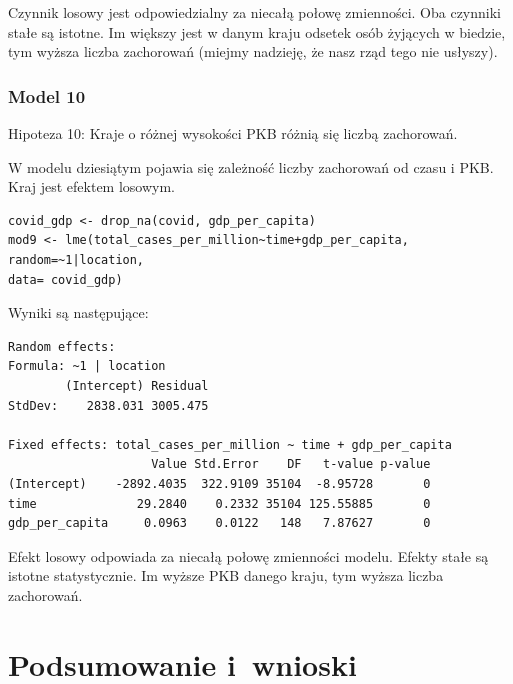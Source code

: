 \documentclass[12pt]{mwbk}
\theoremstyle{plain}
\theoremstyle{definition}
\theoremstyle{remark}
\begin{document}
Czynnik losowy jest odpowiedzialny za niecałą połowę zmienności. Oba czynniki stałe są istotne. Im większy jest w danym kraju odsetek osób żyjących w biedzie, tym wyższa liczba zachorowań (miejmy nadzieję, że nasz rząd tego nie usłyszy).

\subsection{Model 10}

Hipoteza 10: Kraje o różnej wysokości PKB różnią się liczbą zachorowań.


W modelu dziesiątym pojawia się zależność liczby zachorowań od czasu i PKB. Kraj jest efektem losowym.

\begin{verbatim}
covid_gdp <- drop_na(covid, gdp_per_capita)
mod9 <- lme(total_cases_per_million~time+gdp_per_capita,
random=~1|location,
data= covid_gdp)
\end{verbatim}

Wyniki są następujące:
\begin{verbatim}
Random effects:
Formula: ~1 | location
        (Intercept) Residual
StdDev:    2838.031 3005.475

Fixed effects: total_cases_per_million ~ time + gdp_per_capita 
                    Value Std.Error    DF   t-value p-value
(Intercept)    -2892.4035  322.9109 35104  -8.95728       0
time              29.2840    0.2332 35104 125.55885       0
gdp_per_capita     0.0963    0.0122   148   7.87627       0
\end{verbatim}

Efekt losowy odpowiada za niecałą połowę zmienności modelu. Efekty stałe są istotne statystycznie. Im wyższe PKB danego kraju, tym wyższa liczba zachorowań.
\chapter*{Podsumowanie i~wnioski}
\end{document}
